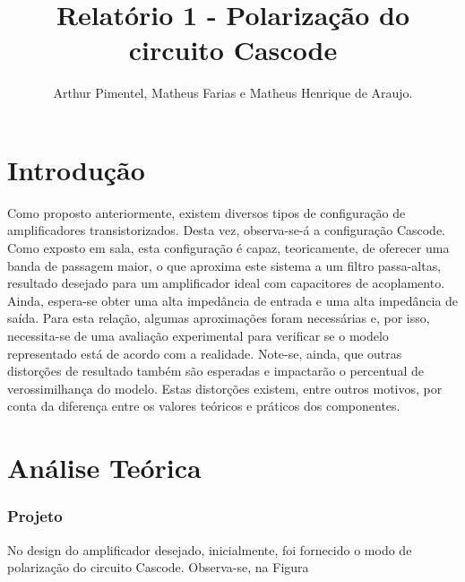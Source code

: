 \documentclass[journal, a4paper]{IEEEtran}
\newcommand\tab[1][1cm]{\hspace*{#1}}
\begin{document}
	\title{Relatório 1 - Polarização do circuito Cascode}
	\author{Arthur Pimentel, Matheus Farias e Matheus Henrique de Araujo.

    }
	\maketitle

\section{Introdução}

    \tab Como proposto anteriormente, existem diversos tipos de configuração de amplificadores transistorizados. Desta vez, observa-se-á a configuração Cascode. Como exposto em sala, esta configuração é capaz, teoricamente, de oferecer uma banda de passagem maior, o que aproxima este sistema a um filtro passa-altas, resultado desejado para um amplificador ideal com capacitores de acoplamento. Ainda, espera-se obter uma alta impedância de entrada e uma alta impedância de saída. Para esta relação, algumas aproximações foram necessárias e, por isso, necessita-se de uma avaliação experimental para verificar se o modelo representado está de acordo com a realidade. Note-se, ainda, que outras distorções de resultado também são esperadas e impactarão o percentual de verossimilhança do modelo. Estas distorções existem, entre outros motivos, por conta da diferença entre os valores teóricos e práticos dos componentes. %

\section{Análise Teórica}
	\subsubsection{Projeto}
	
	    \tab No design do amplificador desejado, inicialmente, foi fornecido o modo de polarização do circuito Cascode. Observa-se, na Figura %
	        
\end{document}
